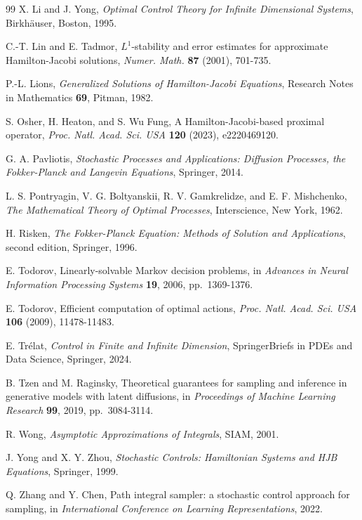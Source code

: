 \documentclass[11pt]{amsart}
\numberwithin{equation}{section}
\numberwithin{figure}{section}
\theoremstyle{definition}\newtheorem{remark}[theorem]{Remark}%
\begin{document}
\begin{thebibliography}{99}
X. Li and J. Yong,
\emph{Optimal Control Theory for Infinite Dimensional Systems},
Birkh\"auser, Boston, 1995.

\ifx%
C.-T. Lin and E. Tadmor,
$L^1$-stability and error estimates for approximate Hamilton-Jacobi solutions,
\emph{Numer. Math.} \textbf{87} (2001), 701-735.
 \fi%
 
P.-L. Lions,
\emph{Generalized Solutions of Hamilton-Jacobi Equations},
Research Notes in Mathematics \textbf{69}, Pitman, 1982.

S. Osher, H. Heaton, and S. Wu Fung,
A Hamilton-Jacobi-based proximal operator,
\emph{Proc. Natl. Acad. Sci. USA} \textbf{120} (2023), e2220469120.

G. A. Pavliotis,
\emph{Stochastic Processes and Applications: Diffusion Processes, the Fokker-Planck and Langevin Equations},
Springer, 2014.

L. S. Pontryagin, V. G. Boltyanskii, R. V. Gamkrelidze, and E. F. Mishchenko,
\emph{The Mathematical Theory of Optimal Processes},
Interscience, New York, 1962.

H. Risken,
\emph{The Fokker-Planck Equation: Methods of Solution and Applications},
second edition, Springer, 1996.

E. Todorov,
Linearly-solvable Markov decision problems,
in \emph{Advances in Neural Information Processing Systems} \textbf{19},
2006, pp.~1369-1376.

E. Todorov,
Efficient computation of optimal actions,
\emph{Proc. Natl. Acad. Sci. USA} \textbf{106} (2009), 11478-11483.

E. Tr\'elat,
\emph{Control in Finite and Infinite Dimension},
SpringerBriefs in PDEs and Data Science, Springer, 2024.

B. Tzen and M. Raginsky,
Theoretical guarantees for sampling and inference in generative models with latent diffusions,
in \emph{Proceedings of Machine Learning Research} \textbf{99},
2019, pp.~3084-3114.

R. Wong,
\emph{Asymptotic Approximations of Integrals},
SIAM, 2001.

J. Yong and X. Y. Zhou,
\emph{Stochastic Controls: Hamiltonian Systems and HJB Equations},
Springer, 1999.

Q. Zhang and Y. Chen,
Path integral sampler: a stochastic control approach for sampling,
in \emph{International Conference on Learning Representations},
2022.


\end{thebibliography}
\end{document}
